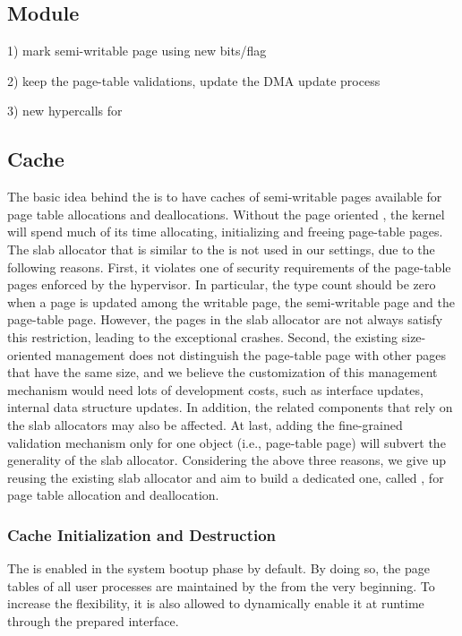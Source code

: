 \subsection{\name Module}\label{sec:module}
1) mark semi-writable page using new bits/flag

2) keep the page-table validations, update the DMA update process

3) new hypercalls for \cache

\subsection{\name Cache}\label{sec:cache}
The basic idea behind the \cache is to have caches of semi-writable pages available for page table allocations and deallocations. 
Without the page oriented \cache, the kernel will spend much of its time allocating, initializing and freeing page-table pages. 
The slab allocator that is similar to the \cache is not used in our settings, due to the following reasons.
First, it violates one of security requirements of the page-table pages enforced by the hypervisor.
In particular, the type count should be zero when a page is updated among the writable page, the semi-writable page and the page-table page.
However, the pages in the slab allocator are not always satisfy this restriction, leading to the exceptional crashes.
Second, the existing size-oriented management does not distinguish the page-table page with other pages that have the same size, and we believe the customization of this management mechanism would need lots of development costs, such as interface updates, internal data structure updates. 
In addition, the related components that rely on the slab allocators may also be affected.
At last, adding the fine-grained validation mechanism only for one object (i.e., page-table page) will subvert the generality of the slab allocator.
Considering the above three reasons, we give up reusing the existing slab allocator and aim to build a dedicated one, called \cache, for page table allocation and deallocation.

\subsubsection{\name Cache Initialization and Destruction}
The \cache is enabled in the system bootup phase by default.
By doing so, the page tables of all user processes are maintained by the \cache from the very beginning.
To increase the flexibility, it is also allowed to dynamically enable it at runtime through the prepared interface.

